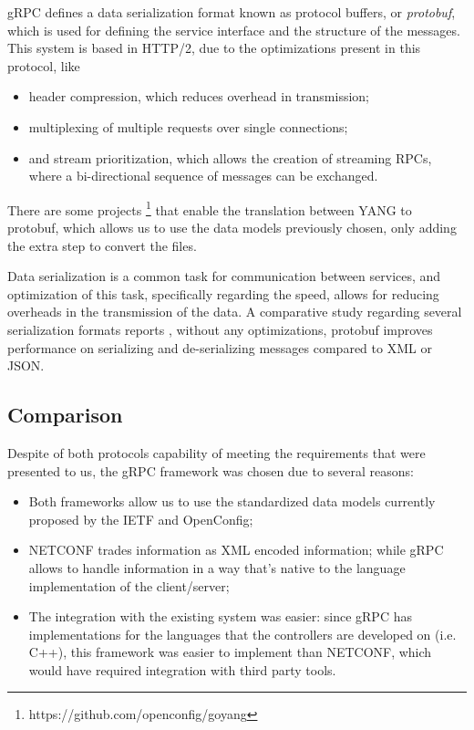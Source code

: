 \par gRPC defines a data serialization format known as protocol buffers, or \textit {protobuf}, which is used for defining the service interface and the
structure of the messages. This system is based in HTTP/2, due to the optimizations present in this protocol, like

\begin{itemize}
    \item header compression, which reduces overhead in transmission;
    \item multiplexing of multiple requests over single connections;
    \item and stream prioritization, which allows the creation of streaming RPCs, where a bi-directional sequence of messages can be exchanged.
\end{itemize}

\par There are some projects \footnote {https://github.com/openconfig/goyang} that enable the translation between YANG to protobuf, which allows us to use the data
models previously chosen, only adding the extra step to convert the files.

\par Data serialization is a common task for communication between services, and optimization of this task, specifically regarding the speed, allows for reducing
overheads in the transmission of the data. A comparative study regarding several serialization formats reports \cite{maxim_novak_serialization_2014}, without any
optimizations, protobuf improves performance on serializing and de-serializing messages compared to XML or JSON.

\subsection{Comparison}

\par Despite of both protocols capability of meeting the requirements that were presented to us, the gRPC framework was chosen due to several reasons:

\begin {itemize}
    \item Both frameworks allow us to use the standardized data models currently proposed by the IETF and OpenConfig;
    \item NETCONF trades information as XML encoded information; while gRPC allows to handle information in a way that’s native to the language implementation 
        of the client/server;
    \item The integration with the existing system was easier: since gRPC has implementations for the languages that the controllers are developed on
        (i.e. C++), this framework was easier to implement than NETCONF, which would have required integration with third party tools.
\end {itemize}

